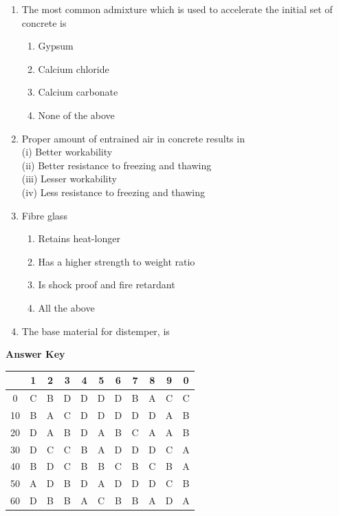 \documentclass[11pt,a4paper]{article}
\begin{document}
\begin{enumerate}
\item{The most common admixture which is used to accelerate the initial set of concrete is}
\begin{enumerate}[label=\Alph*.]
\item{Gypsum}
\item{Calcium chloride}
\item{Calcium carbonate}
\item{None of the above}
\end{enumerate}
\item{Proper amount of entrained air in concrete results in \\
 (i) Better workability \\
 (ii) Better resistance to freezing and thawing \\
 (iii) Lesser workability \\
 (iv) Less resistance to freezing and thawing}
\\
\item{Fibre glass}
\begin{enumerate}[label=\Alph*.]
\item{Retains heat-longer}
\item{Has a higher strength to weight ratio}
\item{Is shock proof and fire retardant}
\item{All the above}
\end{enumerate}
\item{The base material for distemper, is}
\\
\end{enumerate}
\textbf{Answer Key}
\begin{tabular}{ | c | c c c c c c c c c c | }
\hline
 & 1 & 2 & 3 & 4 & 5 & 6 & 7 & 8 & 9 & 0 \\
\hline
0 & C & B & D & D & D & D & B & A & C & C \\
10 & B & A & C & D & D & D & D & D & A & B \\
20 & D & A & B & D & A & B & C & A & A & B \\
30 & D & C & C & B & A & D & D & D & C & A \\
40 & B & D & C & B & B & C & B & C & B & A \\
50 & A & D & B & D & A & D & D & D & C & B \\
60 & D & B & B & A & C & B & B & A & D & A \\
\hline
\end{tabular}
\clearpage
\end{document}
